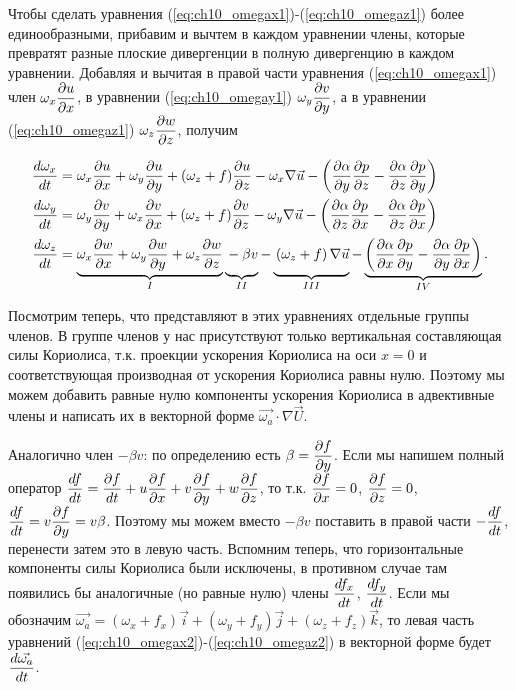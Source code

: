 Чтобы сделать уравнения (\ref{eq:ch10_omegax1})-(\ref{eq:ch10_omegaz1}) более единообразными, прибавим и вычтем в каждом уравнении члены, которые превратят разные плоские дивергенции в полную дивергенцию в каждом уравнении. Добавляя и вычитая в правой части уравнения (\ref{eq:ch10_omegax1}) член $\omega_x\displaystyle\frac{\partial u}{\partial x}$, в уравнении (\ref{eq:ch10_omegay1}) $\omega_y\displaystyle\frac{\partial v}{\partial y}$, а в уравнении (\ref{eq:ch10_omegaz1}) $\omega_z\displaystyle\frac{\partial w}{\partial z}$, получим 

\begin{align}
    \td{\omega_x}{t}&= \omega_x\pd{u}{x} + \omega_y\pd{u}{y} + (\omega_z+f)\pd{u}{z} - \omega_x\nabla\vec{u}-\left( \pd{\alpha}{y}\pd{p}{z} - \pd{\alpha}{z}\pd{p}{y} \right) \label{eq:ch10_omegax2} \\
    \td{\omega_y}{t}&=\omega_y\pd{v}{y} + \omega_x\pd{v}{x} + (\omega_z+f)\pd{v}{z} -\omega_y\nabla\vec{u}-\left( \pd{\alpha}{z}\pd{p}{x} - \pd{\alpha}{z}\pd{p}{x} \right) \label{eq:ch10_omegay2} \\
    \td{\omega_z}{t}& = 
    \underbrace{\omega_x\pd{w}{x} + \omega_y\pd{w}{y} + \omega_z\pd{w}{z}}_{\romans{1}} 
    \underbrace{\vphantom{\omega_x\pd{w}{x} + \omega_y\pd{w}{y} + \omega_z\pd{w}{z}}-\beta v}_{\romans{2}} - 
    \underbrace{\vphantom{\omega_x\pd{w}{x} + \omega_y\pd{w}{y} + \omega_z\pd{w}{z}}\left( \omega_z + f \right) \nabla\vec{u}}_{\romans{3}}-
    \underbrace{\left( \pd{\alpha}{x}\pd{p}{y} - \pd{\alpha}{y}\pd{p}{x} \right)}_{\romans{4}} \label{eq:ch10_omegaz2}.
\end{align}

Посмотрим теперь, что представляют в этих уравнениях отдельные группы членов. В группе членов  у нас присутствуют только вертикальная составляющая силы Кориолиса, т.к. проекции ускорения Кориолиса на оси $x=0$ и соответствующая производная от ускорения Кориолиса равны нулю. Поэтому мы можем добавить равные нулю компоненты ускорения Кориолиса в адвективные члены и написать их в векторной форме $\vec{\omega_a}\cdot\nabla\vec{U}$.  

Аналогично член  $- \beta v$: по определению есть $\beta=\displaystyle\frac{\partial f}{\partial y}$. Если мы напишем полный оператор $\displaystyle\frac{d f}{d t}=\displaystyle\frac{\partial f}{dt}+ u\frac{\partial f}{\partial x}+v\frac{\partial f}{\partial y}+w\frac{\partial f}{\partial z}$, то т.к. $\displaystyle\frac{\partial f}{\partial x}=0$, $\displaystyle\frac{\partial f}{\partial z}=0$, $\displaystyle\frac{d f}{d t}=v\displaystyle\frac{\partial f}{\partial y}=v\beta$. Поэтому мы можем вместо $-\beta v$ поставить в правой части $-\displaystyle\frac{d f}{d t}$, перенести затем это в левую часть. Вспомним теперь, что горизонтальные компоненты силы Кориолиса были исключены, в противном случае там появились бы аналогичные (но равные нулю)  члены $\displaystyle\frac{d f_x}{d t}$, $\displaystyle\frac{d f_y}{d t}$. Если мы обозначим $\vec{\omega_a}=(\omega_x+f_x)\vec{i}+(\omega_y+f_y)\vec{j}+(\omega_z+f_z)\vec{k}$, то левая часть уравнений (\ref{eq:ch10_omegax2})-(\ref{eq:ch10_omegaz2}) в векторной форме будет $\displaystyle\frac{d \vec{\omega_a}}{d t}$.

